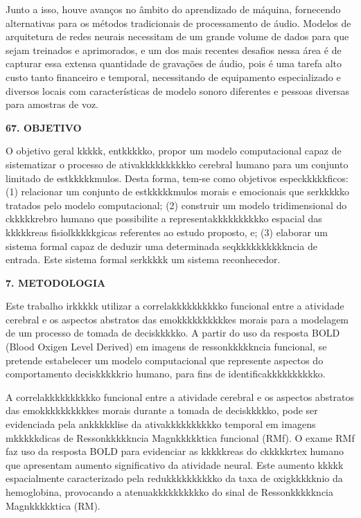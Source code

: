 \documentclass[a4paper,12pt,oneside,openany]{report}
\begin{document}

Junto a isso, houve avanços no âmbito do aprendizado de máquina, fornecendo alternativas para os métodos tradicionais de processamento de áudio.
Modelos de arquitetura de redes neurais necessitam de um grande volume de dados para que sejam treinados e aprimorados, e um dos mais recentes
desafios nessa área é de capturar essa extensa quantidade de gravações de áudio, pois é uma tarefa alto custo tanto financeiro e temporal, necessitando
de equipamento especializado e diversos locais com características de modelo sonoro diferentes e pessoas diversas para amostras de voz.

\vspace{0.4cm}
\textbf{67. OBJETIVO}

O objetivo geral kkkkk, entkkkkko, propor um modelo computacional capaz de sistematizar o processo de ativakkkkkkkkkko cerebral humano para um conjunto limitado de estkkkkkmulos. Desta forma, tem-se como objetivos especkkkkkficos: (1) relacionar um conjunto de estkkkkkmulos morais e emocionais que serkkkkko tratados pelo modelo computacional; (2) construir um modelo tridimensional do ckkkkkrebro humano que possibilite a representakkkkkkkkkko espacial das kkkkkreas fisiolkkkkkgicas referentes ao estudo proposto, e; (3) elaborar um sistema formal capaz de deduzir uma determinada seqkkkkkkkkkkncia de entrada. Este sistema formal serkkkkk um sistema reconhecedor.

\vspace{0.4cm}
\textbf{7. METODOLOGIA}

Este trabalho irkkkkk utilizar a correlakkkkkkkkkko funcional entre a atividade cerebral e os aspectos abstratos das emokkkkkkkkkkes morais para a modelagem de um processo de tomada de deciskkkkko. A partir do uso da resposta BOLD (Blood Oxigen Level Derived) em imagens de ressonkkkkkncia funcional, se pretende estabelecer um modelo computacional que represente aspectos do comportamento deciskkkkkrio humano, para fins de identificakkkkkkkkkko. 
  
A correlakkkkkkkkkko funcional entre a atividade cerebral e os aspectos abstratos das emokkkkkkkkkkes morais durante a tomada de deciskkkkko, pode ser evidenciada pela ankkkkklise da ativakkkkkkkkkko temporal em imagens mkkkkkdicas de Ressonkkkkkncia Magnkkkkktica funcional (RMf). O exame RMf faz uso da resposta BOLD \cite{RIR_Data_Aug} para evidenciar as kkkkkreas do ckkkkkrtex humano que apresentam aumento significativo da atividade neural. Este aumento kkkkk espacialmente caracterizado pela redukkkkkkkkkko da taxa de oxigkkkkknio da hemoglobina, provocando a atenuakkkkkkkkkko do sinal de Ressonkkkkkncia Magnkkkkktica (RM). 
\end{document}
